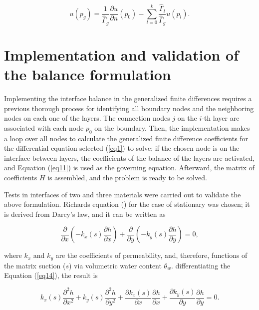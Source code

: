 \documentclass[a4paper,fleqn]{cas-sc}
\begin{document}
\begin{equation}
 u(p_g)=\frac{1}{\hat{\Gamma}_g}\frac{\partial u}{\partial n}(p_0)-\sum_{l=0}^k\frac{\hat{\Gamma}_l}{{\hat{\Gamma}_g}} u(p_l).
 \label{eq13}
\end{equation}


\section{Implementation and validation of the balance formulation}

Implementing the interface balance in the generalized finite differences requires a previous thorough process for identifying all boundary nodes and the neighboring nodes on each one of the layers. The connection nodes $j$ on the $i$-th layer are associated with each node $p_0$ on the boundary. Then, the implementation makes a loop over all nodes to calculate the generalized finite difference coefficients for the differential equation selected (\ref{eq1}) to solve; if the chosen node is on the interface between layers, the coefficients of the balance of the layers are activated, and Equation (\ref{eq11}) is used as the governing equation. Afterward, the matrix of coefficients $H$ is assembled, and the problem is ready to be solved.    

Tests in interfaces of two and three materials were carried out to validate the above formulation.  Richards equation (\cite{fredlund2012}) for the case of stationary was chosen; it is derived from Darcy's law, and it can be written as

\begin{equation}
  \frac{\partial}{\partial x}\left(-k_x(s) \frac{\partial h}{\partial x} \right)+
  \frac{\partial}{\partial y}\left(-k_y(s) \frac{\partial h}{\partial y} \right)=0,
  \label{eq14}  
\end{equation}

where $k_x$ and $k_y$ are the coefficients of permeability, and, therefore, functions of the matrix suction ($s$) via volumetric water content $\theta_w$. differentiating the Equation (\ref{eq14}), the result is

\begin{equation}
  k_x(s) \frac{\partial^2 h}{\partial x^2} +k_y(s) \frac{\partial^2 h}{\partial y^2}+
  \frac{\partial k_x(s)}{\partial x} \frac{\partial h}{\partial x}+
  \frac{\partial k_y(s)}{\partial y} \frac{\partial h}{\partial y}=0.
  \label{eq15}  
\end{equation}
\end{document}
